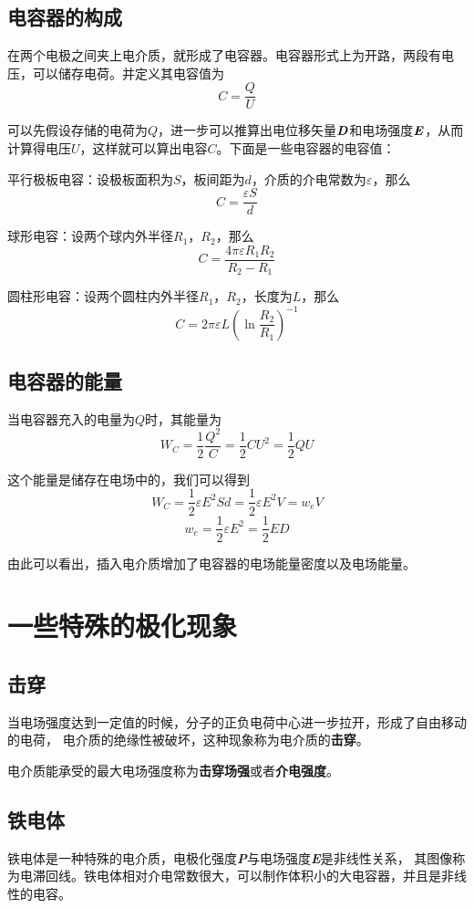 \documentclass[UTF8,openany]{book}
\begin{document}
	\subsection{电容器的构成}
	\par 在两个电极之间夹上电介质，就形成了电容器。电容器形式上为开路，两段有电压，可以储存电荷。并定义其电容值为
	$$C=\frac{Q}{U}$$
	\par 可以先假设存储的电荷为$Q$，进一步可以推算出电位移矢量$\textbf{\textit{D}}$和电场强度$\textbf{\textit{E}}$，从而计算得电压$U$，这样就可以算出电容$C$。下面是一些电容器的电容值：
	\par 平行极板电容：设极板面积为$S$，板间距为$d$，介质的介电常数为$\varepsilon$，那么
	$$C=\frac{\varepsilon S}{d}$$
	\par 球形电容：设两个球内外半径$R_1$，$R_2$，那么
	$$C=\frac{4\pi\varepsilon R_1R_2}{R_2-R_1}$$
	\par 圆柱形电容：设两个圆柱内外半径$R_1$，$R_2$，长度为$L$，那么
	$$C=2\pi\varepsilon L\left(\ln\frac{R_2}{R_1}\right)^{-1}$$
	\subsection{电容器的能量}
	\par 当电容器充入的电量为$Q$时，其能量为
	$$W_C=\frac{1}{2}\frac{Q^2}{C}=\frac{1}{2}CU^2=\frac{1}{2}QU$$
	\par 这个能量是储存在电场中的，我们可以得到
	$$W_C=\frac{1}{2}\varepsilon E^2Sd=\frac{1}{2}\varepsilon E^2V=w_eV$$
	$$w_e=\frac{1}{2}\varepsilon E^2=\frac{1}{2}ED$$
	\par 由此可以看出，插入电介质增加了电容器的电场能量密度以及电场能量。
	\section{一些特殊的极化现象}
	\subsection{击穿}
	\par 当电场强度达到一定值的时候，分子的正负电荷中心进一步拉开，形成了自由移动的电荷，
	电介质的绝缘性被破坏，这种现象称为电介质的\textbf{击穿}。
	\par 电介质能承受的最大电场强度称为\textbf{击穿场强}或者\textbf{介电强度}。
	\subsection{铁电体}
	\par 铁电体是一种特殊的电介质，电极化强度\textbf{\textit{P}}与电场强度\textbf{\textit{E}}是非线性关系，
	其图像称为电滞回线。铁电体相对介电常数很大，可以制作体积小的大电容器，并且是非线性的电容。
\end{document}
